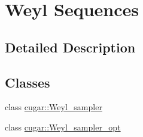 \hypertarget{group__weyl}{}\section{Weyl Sequences}
\label{group__weyl}


\subsection{Detailed Description}
\subsection*{Classes}
\begin{DoxyCompactItemize}
\item 
class \hyperlink{classcugar_1_1_weyl__sampler}{cugar\+::\+Weyl\+\_\+sampler}
\item 
class \hyperlink{classcugar_1_1_weyl__sampler__opt}{cugar\+::\+Weyl\+\_\+sampler\+\_\+opt}
\end{DoxyCompactItemize}
